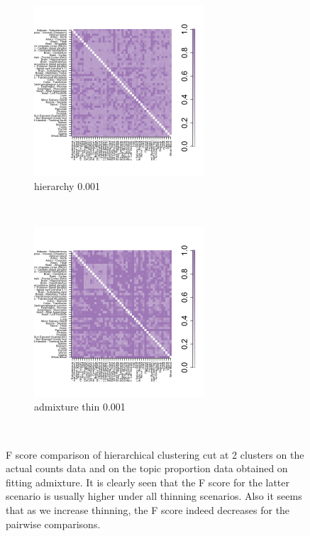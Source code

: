 \begin{figure}[ht]
     \begin{subfigure}[t]{0.5\textwidth}
        \centering
        \includegraphics[height=2.5in]{../plots/hierarchy_F_thin_0_001.png}
        \caption{hierarchy 0.001}
    \end{subfigure}%
    ~
    \begin{subfigure}[t]{0.5\textwidth}
        \centering
        \includegraphics[height=2.5in]{../plots/admixture_F_thin_0_001.png}
        \caption{admixture thin 0.001}
    \end{subfigure}\\

    \caption{F score comparison of hierarchical clustering cut at 2 clusters on the actual counts data and on the topic proportion data obtained on fitting admixture. It is clearly seen that the F score for the latter scenario  is usually higher under all thinning scenarios. Also it seems that as we increase thinning, the F score indeed decreases for the pairwise comparisons.}
\end{figure}





